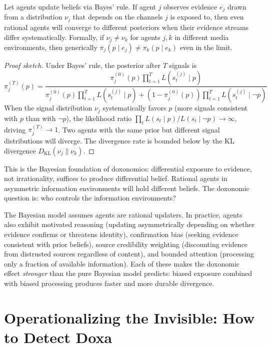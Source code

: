 \begin{proposition}
\label{prop:unequal-updating}
Let agents update beliefs via Bayes' rule.
If agent $j$ observes evidence $e_j$ drawn from a distribution $\nu_j$ that depends on the channels $j$ is exposed to, then even rational agents will converge to different posteriors when their evidence streams differ systematically.
Formally, if $\nu_j \neq \nu_k$ for agents $j, k$ in different media environments, then generically $\pi_j(p \mid e_j) \neq \pi_k(p \mid e_k)$ even in the limit.
\end{proposition}

\begin{proof}[Proof sketch]
Under Bayes' rule, the posterior after $T$ signals is
\[
  \pi_j^{(T)}(p) = \frac{\pi_j^{(0)}(p) \prod_{t=1}^{T} L(s_t^{(j)} \mid p)}{\pi_j^{(0)}(p) \prod_{t=1}^{T} L(s_t^{(j)} \mid p) + (1 - \pi_j^{(0)}(p)) \prod_{t=1}^{T} L(s_t^{(j)} \mid \neg p)}
\]
When the signal distribution $\nu_j$ systematically favors $p$ (more signals consistent with $p$ than with $\neg p$), the likelihood ratio $\prod_t L(s_t \mid p)/L(s_t \mid \neg p) \to \infty$, driving $\pi_j^{(T)} \to 1$.
Two agents with the same prior but different signal distributions will diverge.
The divergence rate is bounded below by the KL divergence $D_{\mathrm{KL}}(\nu_j \| \nu_k)$.
\end{proof}

This is the Bayesian foundation of doxonomics: differential exposure to evidence, not irrationality, suffices to produce differential belief.
Rational agents in asymmetric information environments will hold different beliefs. The doxonomic question is: who controls the information environments?

\begin{remark}
The Bayesian model assumes agents are rational updaters.
In practice, agents also exhibit motivated reasoning (updating asymmetrically depending on whether evidence confirms or threatens identity), confirmation bias (seeking evidence consistent with prior beliefs), source credibility weighting (discounting evidence from distrusted sources regardless of content), and bounded attention (processing only a fraction of available information).
Each of these makes the doxonomic effect \emph{stronger} than the pure Bayesian model predicts: biased exposure combined with biased processing produces faster and more durable divergence.
\end{remark}


\section{Operationalizing the Invisible: How to Detect Doxa}
\label{sec:ch2-detecting-doxa}


